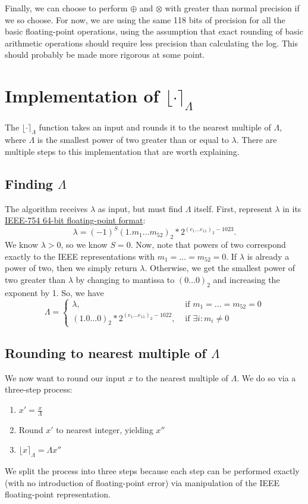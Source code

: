 \documentclass[11pt]{scrartcl} %
\begin{document}
Finally, we can choose to perform $\oplus$ and $\otimes$ with greater than normal precision if we so choose. For now, we are using the same 118 bits of precision for all the basic floating-point operations, using the assumption that exact rounding of basic arithmetic operations should require less precision than calculating the log. This should probably be made more rigorous at some point.

\section{Implementation of $\lfloor \cdot \rceil_{\Lambda}$}
\label{sec:implementation_of_rounding}
The $\lfloor \cdot \rceil_{\Lambda}$ function takes an input and rounds it to the nearest multiple of $\Lambda$, where $\Lambda$ is the smallest power of two greater than or equal to $\lambda$. There are multiple steps to this implementation that are worth explaining.

\subsection{Finding $\Lambda$}
\label{subsec:finding_lambda}
The algorithm receives $\lambda$ as input, but must find $\Lambda$ itself. First, represent $\lambda$ in its \href{https://en.wikipedia.org/wiki/Double-precision_floating-point_format}{IEEE-754 64-bit floating-point format}:
\[ \lambda = (-1)^S (1.m_{1} \hdots m_{52})_2 * 2^{(e_1 \hdots e_{11})_2-1023}. \]
We know $\lambda > 0$, so we know $S = 0$. Now, note that powers of two correspond exactly to the IEEE representations with $m_1 = \hdots = m_{52} = 0$. If $\lambda$ is already a power of two, then we simply return $\lambda$. Otherwise, we get the smallest power of two greater than $\lambda$ by changing to mantissa to $(0 \hdots 0)_2$ and increasing the exponent by 1. So, we have
\begin{equation}
    \Lambda =
        \begin{cases}
            \lambda, & \text{ if } m_1 = \hdots = m_{52} = 0 \\
            (1.0 \hdots 0)_2 * 2^{(e_1 \hdots e_{11})_2-1022}, & \text{ if } \exists i: m_i \neq 0
        \end{cases}
\end{equation}

\subsection{Rounding to nearest multiple of $\Lambda$}
We now want to round our input $x$ to the nearest multiple of $\Lambda$. We do so via a three-step process:
\begin{enumerate}
    \item $x' = \frac{x}{\Lambda}$
    \item Round $x'$ to nearest integer, yielding $x''$
    \item $\lfloor x \rceil_{\Lambda} = \Lambda x''$
\end{enumerate}
We split the process into three steps because each step can be performed exactly (with no introduction of floating-point error) via manipulation of the IEEE floating-point representation.
\end{document}
